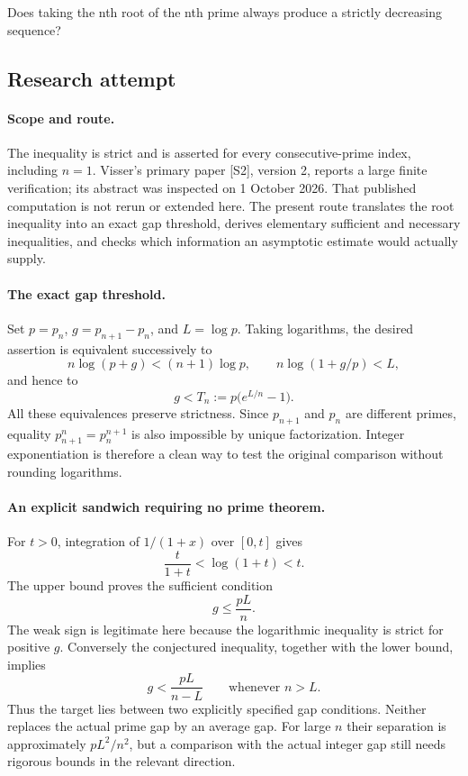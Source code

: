 \documentclass[11pt,a4paper]{article}
\begin{document}
Does taking the nth root of the nth prime always produce a strictly decreasing sequence?

\subsection{Research attempt}

\paragraph{Scope and route.}
The inequality is strict and is asserted for every consecutive-prime
index, including $n=1$. Visser's primary paper [S2], version 2, reports
a large finite verification; its abstract was inspected on 1 October
2026. That published computation is not rerun or extended here. The
present route translates the root inequality into an exact gap threshold,
derives elementary sufficient and necessary inequalities, and checks
which information an asymptotic estimate would actually supply.

\paragraph{The exact gap threshold.}
Set $p=p_n$, $g=p_{n+1}-p_n$, and $L=\log p$. Taking logarithms,
the desired assertion is equivalent successively to
\[
 n\log(p+g)<(n+1)\log p,
 \qquad n\log(1+g/p)<L,
\]
and hence to
\[
 g<T_n:=p\bigl(e^{L/n}-1\bigr).
\]
All these equivalences preserve strictness. Since $p_{n+1}$ and $p_n$
are different primes, equality $p_{n+1}^n=p_n^{n+1}$ is also impossible
by unique factorization. Integer exponentiation is therefore a clean
way to test the original comparison without rounding logarithms.

\paragraph{An explicit sandwich requiring no prime theorem.}
For $t>0$, integration of $1/(1+x)$ over $[0,t]$ gives
\[
 \frac{t}{1+t}<\log(1+t)<t.
\]
The upper bound proves the sufficient condition
\[
                     g\le\frac{pL}{n}.
\]
The weak sign is legitimate here because the logarithmic inequality
is strict for positive $g$. Conversely the conjectured inequality,
together with the lower bound, implies
\[
 g<\frac{pL}{n-L}\qquad\text{whenever }n>L.
\]
Thus the target lies between two explicitly specified gap conditions.
Neither replaces the actual prime gap by an average gap. For large
$n$ their separation is approximately $pL^2/n^2$, but a comparison
with the actual integer gap still needs rigorous bounds in the relevant
direction.
\end{document}
